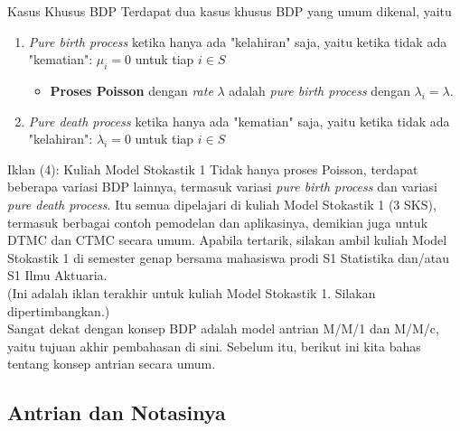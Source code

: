\documentclass{beamer}
\begin{document}

\begin{frame}{Kasus Khusus BDP}
    Terdapat dua kasus khusus BDP yang umum dikenal, yaitu
    \begin{enumerate}
        \item \textit{Pure birth process} ketika hanya ada "kelahiran" saja, yaitu ketika tidak ada "kematian": \(\mu_i = 0\) untuk tiap \(i \in S\)
        \begin{itemize}
            \item \textbf{Proses Poisson} dengan \textit{rate} \(\lambda\) adalah \textit{pure birth process} dengan \(\lambda_i = \lambda\).
        \end{itemize}
        \item \textit{Pure death process} ketika hanya ada "kematian" saja, yaitu ketika tidak ada "kelahiran": \(\lambda_i = 0\) untuk tiap \(i \in S\)
    \end{enumerate}
\end{frame}

\begin{frame}{Iklan (4): Kuliah Model Stokastik 1}
    Tidak hanya proses Poisson, terdapat beberapa variasi BDP lainnya, termasuk variasi \textit{pure birth process} dan variasi \textit{pure death process}. Itu semua dipelajari di kuliah Model Stokastik 1 (3 SKS), termasuk berbagai contoh pemodelan dan aplikasinya, demikian juga untuk DTMC dan CTMC secara umum. Apabila tertarik, silakan ambil kuliah Model Stokastik 1 di semester genap bersama mahasiswa prodi S1 Statistika dan/atau S1 Ilmu Aktuaria. \\[0.5em]

    (Ini adalah iklan terakhir untuk kuliah Model Stokastik 1. Silakan dipertimbangkan.) \\[0.5em]

    Sangat dekat dengan konsep BDP adalah model antrian M/M/1 dan M/M/c, yaitu tujuan akhir pembahasan di sini. Sebelum itu, berikut ini kita bahas tentang konsep antrian secara umum.
\end{frame}

\subsection{Antrian dan Notasinya}
\end{document}
